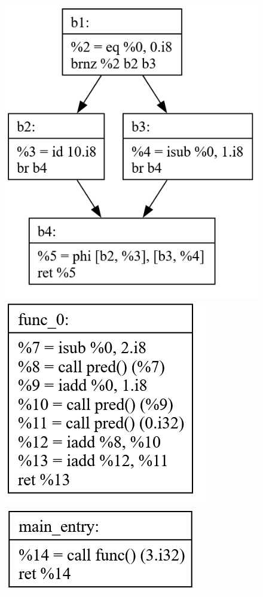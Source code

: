 \documentclass[11pt, a4paper, titlepage]{article}
\begin{document}
\begin{figure}[H]
  \centering
  \includegraphics[scale=0.3]{images/i39.png}
  \includegraphics[scale=0.3]{images/i40.png}
  \includegraphics[scale=0.3]{images/i41.png}
\end{figure}
\end{document}
